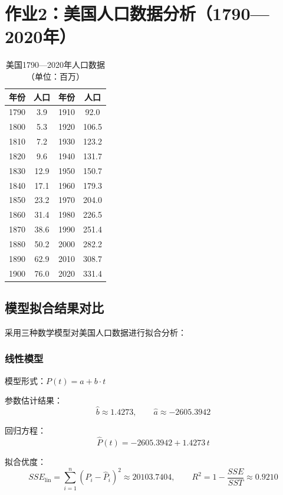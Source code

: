 \documentclass{article}
\begin{document}
	\newpage
	
	\section{作业2：美国人口数据分析（1790—2020年）}
	
	\begin{table}[htbp]
		\centering
		\caption{美国1790—2020年人口数据（单位：百万）}
		\renewcommand{\arraystretch}{1.2}
		\renewcommand{\heavyrulewidth}{1.2pt}
		\setlength{\tabcolsep}{3em}
		\begin{tabular}{cccc}
			\toprule
			年份 & 人口 & 年份 & 人口 \\
			\midrule
			1790 & 3.9  & 1910 & 92.0  \\
			1800 & 5.3  & 1920 & 106.5 \\
			1810 & 7.2  & 1930 & 123.2 \\
			1820 & 9.6  & 1940 & 131.7 \\
			1830 & 12.9 & 1950 & 150.7 \\
			1840 & 17.1 & 1960 & 179.3 \\
			1850 & 23.2 & 1970 & 204.0 \\
			1860 & 31.4 & 1980 & 226.5 \\
			1870 & 38.6 & 1990 & 251.4 \\
			1880 & 50.2 & 2000 & 282.2 \\
			1890 & 62.9 & 2010 & 308.7 \\
			1900 & 76.0 & 2020 & 331.4 \\
			\bottomrule
		\end{tabular}
		\renewcommand{\heavyrulewidth}{0.8pt}
	\end{table}
	
	\subsection{模型拟合结果对比}
	
	采用三种数学模型对美国人口数据进行拟合分析：
	
	\subsubsection{线性模型}
	模型形式：$P(t) = a + b \cdot t$
	
	参数估计结果：
	\[
	\hat{b} \approx 1.4273,\qquad \hat{a} \approx -2605.3942
	\]
	
	回归方程：
	\[
	\hat{P}(t) = -2605.3942 + 1.4273\,t
	\]
	
	拟合优度：
	\[
	SSE_{\text{lin}} = \sum_{i=1}^n (P_i - \hat{P}_i)^2 \approx 20103.7404,\qquad R^2 = 1 - \frac{SSE}{SST} \approx 0.9210
	\]
	
\end{document}
